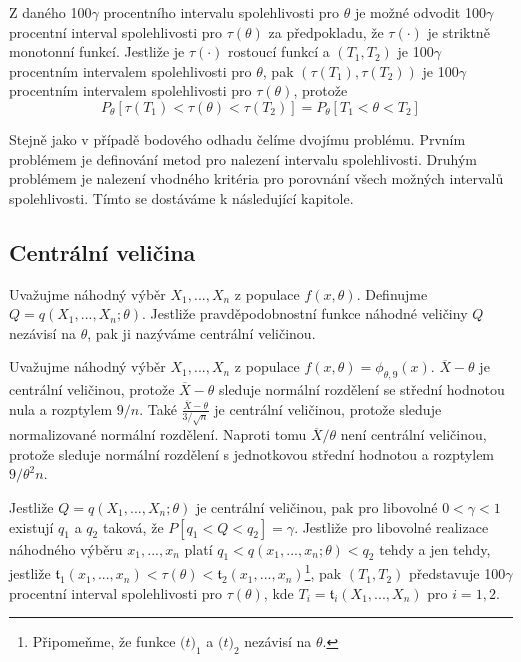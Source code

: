 Z daného 100$\gamma$ procentního intervalu spolehlivosti pro $\theta$ je možné odvodit 100$\gamma$ procentní interval spolehlivosti pro $\tau(\theta)$ za předpokladu, že $\tau(\cdot)$ je striktně monotonní funkcí. Jestliže je $\tau(\cdot)$ rostoucí funkcí a $(T_1, T_2)$ je 100$\gamma$ procentním intervalem spolehlivosti pro $\theta$, pak $(\tau(T_1), \tau(T_2))$ je 100$\gamma$ procentním intervalem spolehlivosti pro $\tau(\theta)$, protože
\begin{equation*}
P_{\theta}[\tau(T_1) < \tau(\theta) < \tau(T_2)] = P_{\theta}[T_1 < \theta < T_2]
\end{equation*}

Stejně jako v případě bodového odhadu čelíme dvojímu problému. Prvním problémem je definování metod pro nalezení intervalu spolehlivosti. Druhým problémem je nalezení vhodného kritéria pro porovnání všech možných intervalů spolehlivosti. Tímto se dostáváme k následující kapitole.

\subsection{Centrální veličina}

\begin{definition}
Uvažujme náhodný výběr $X_1, ..., X_n$ z populace $f(x, \theta)$. Definujme $Q = \mathit{q}(X_1, ..., X_n; \theta)$. Jestliže pravděpodobnostní funkce náhodné veličiny $Q$ nezávisí na $\theta$, pak ji nazýváme centrální veličinou.
\end{definition}

\begin{example}
Uvažujme náhodný výběr $X_1, ..., X_n$ z populace $f(x, \theta) = \phi_{\theta, 9}(x)$. $\overline{X} - \theta$ je centrální veličinou, protože $\overline{X} - \theta$ sleduje normální rozdělení se střední hodnotou nula a rozptylem $9/n$. Také $\frac{\overline{X} - \theta}{3/ \sqrt{n}}$ je centrální veličinou, protože sleduje normalizované normální rozdělení. Naproti tomu $\overline{X}/ \theta$ není centrální veličinou, protože sleduje normální rozdělení s jednotkovou střední hodnotou a rozptylem $9/\theta^2n$.
\end{example}

\begin{definition}
Jestliže $Q = \mathit{q}(X_1, ..., X_n; \theta)$ je centrální veličinou, pak pro libovolné $0 < \gamma < 1$ existují $q_1$ a $q_2$ taková, že $P[q_1 < Q < q_2] = \gamma$. Jestliže pro libovolné realizace náhodného výběru $x_1, ..., x_n$ platí $q_1 < \mathit{q}(x_1, ..., x_n; \theta) < q_2$ tehdy a jen tehdy, jestliže $\mathfrak{t}_1(x_1, ..., x_n) < \tau(\theta) < \mathfrak{t}_2(x_1, ..., x_n)$\footnote{Připomeňme, že funkce $\mathit(t)_1$ a $\mathit(t)_2$ nezávisí na $\theta$.}, pak $(T_1, T_2)$ představuje 100$\gamma$ procentní interval spolehlivosti pro $\tau(\theta)$, kde $T_i = \mathfrak{t}_i(X_1, ..., X_n)$ pro $i = 1, 2$.
\end{definition}

